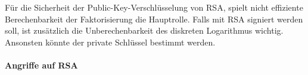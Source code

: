     Für die Sicherheit der Public-Key-Verschlüsselung von RSA, spielt nicht effiziente Berechenbarkeit der Faktorisierung die Hauptrolle. Falls mit RSA signiert werden soll, ist zusätzlich die Unberechenbarkeit des diskreten Logarithmus wichtig. Ansonsten könnte der private Schlüssel bestimmt werden.

    \paragraph{Angriffe auf RSA}

